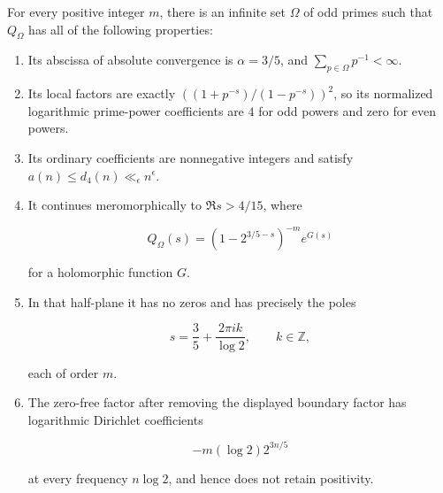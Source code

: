 \begin{proposition}\label{prop:ob-primes}

For every positive integer \(m\), there is an infinite set \(\Omega\) of odd primes such that \(Q_\Omega\) has all of the following properties:

\begin{enumerate}
\def\labelenumi{\arabic{enumi}.}

\item
  Its abscissa of absolute convergence is \(\alpha=3/5\), and \(\sum_{p\in\Omega}p^{-1}<\infty\).
\item
  Its local factors are exactly \(((1+p^{-s})/(1-p^{-s}))^2\), so its normalized logarithmic prime-power coefficients are \(4\) for odd powers and zero for even powers.
\item
  Its ordinary coefficients are nonnegative integers and satisfy \(a(n)\le d_4(n)\ll_\epsilon n^\epsilon\).
\item
  It continues meromorphically to \(\Re s>4/15\), where

\begin{equation}\label{eq:ob5-1}
Q_\Omega(s)=(1-2^{3/5-s})^{-m}e^{G(s)}
\end{equation}

for a holomorphic function \(G\).
\item In that half-plane it has no zeros and has precisely the poles

\begin{equation}\label{eq:ob5-2}
s=\frac35+\frac{2\pi i k}{\log2},\qquad k\in\mathbb Z,
\end{equation}

each of order \(m\).
\item The zero-free factor after removing the displayed boundary factor has logarithmic Dirichlet coefficients

\begin{equation}\label{eq:ob5-3}
-m(\log2)2^{3n/5}
\end{equation}

at every frequency \(n\log2\), and hence does not retain positivity.
\end{enumerate}

\end{proposition}

